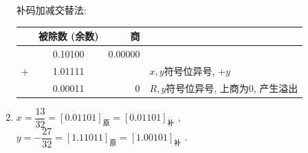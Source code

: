 \documentclass[UTF8]{report}
\newcommand{\la}{\leftarrow}
\newcommand{\cdclass}[2]{[#1]_{\text{#2}}}
\newcommand{\spz}{\phantom{0}}
\newenvironment{solution}{{\noindent\hskip 2em \bf 解 \quad}}{}
\begin{document}
\begin{solution}
\begin{enumerate}
        补码加减交替法:
        \begin{tabular}{cc|r|l}
            & 被除数 (余数)   & 商    & \\
           \hline
            & 0.10100 &  $0.00000$ &   \\
           +& 1.01111 &         $ $ & $x,y$符号位异号, $+y$ \\
           \hline
            & 0.00011 &        $0 $ & $R,y$符号位异号, 上商为$0$, 产生溢出 \\
        \end{tabular}


        \item $x =  \dfrac{13}{32} = \cdclass{0.01101}{原} = \cdclass{0.01101}{补}$  , $y = -\dfrac{27}{32} = \cdclass{1.11011}{原} = \cdclass{1.00101}{补}$   .
                

\end{enumerate}
\end{solution}
\end{document}
